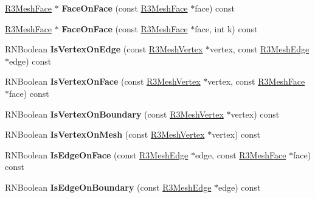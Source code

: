 \begin{DoxyCompactItemize}
\item 
\hyperlink{class_r3_mesh_face}{R3\+Mesh\+Face} $\ast$ {\bfseries Face\+On\+Face} (const \hyperlink{class_r3_mesh_face}{R3\+Mesh\+Face} $\ast$face) const \hypertarget{class_r3_mesh_ab95e83e97f5faf2c30619b98b9440da2}{}\label{class_r3_mesh_ab95e83e97f5faf2c30619b98b9440da2}

\item 
\hyperlink{class_r3_mesh_face}{R3\+Mesh\+Face} $\ast$ {\bfseries Face\+On\+Face} (const \hyperlink{class_r3_mesh_face}{R3\+Mesh\+Face} $\ast$face, int k) const \hypertarget{class_r3_mesh_aca889aae9c6e0a4fea8d530c7bfd36ae}{}\label{class_r3_mesh_aca889aae9c6e0a4fea8d530c7bfd36ae}

\item 
R\+N\+Boolean {\bfseries Is\+Vertex\+On\+Edge} (const \hyperlink{class_r3_mesh_vertex}{R3\+Mesh\+Vertex} $\ast$vertex, const \hyperlink{class_r3_mesh_edge}{R3\+Mesh\+Edge} $\ast$edge) const \hypertarget{class_r3_mesh_a265515e4a620c0176916f31546e643d8}{}\label{class_r3_mesh_a265515e4a620c0176916f31546e643d8}

\item 
R\+N\+Boolean {\bfseries Is\+Vertex\+On\+Face} (const \hyperlink{class_r3_mesh_vertex}{R3\+Mesh\+Vertex} $\ast$vertex, const \hyperlink{class_r3_mesh_face}{R3\+Mesh\+Face} $\ast$face) const \hypertarget{class_r3_mesh_ad72f53c674bdc231a0d5bf9e7f6226c5}{}\label{class_r3_mesh_ad72f53c674bdc231a0d5bf9e7f6226c5}

\item 
R\+N\+Boolean {\bfseries Is\+Vertex\+On\+Boundary} (const \hyperlink{class_r3_mesh_vertex}{R3\+Mesh\+Vertex} $\ast$vertex) const \hypertarget{class_r3_mesh_a03e5a0631c9f9d18da6ecefdc6b6a3b9}{}\label{class_r3_mesh_a03e5a0631c9f9d18da6ecefdc6b6a3b9}

\item 
R\+N\+Boolean {\bfseries Is\+Vertex\+On\+Mesh} (const \hyperlink{class_r3_mesh_vertex}{R3\+Mesh\+Vertex} $\ast$vertex) const \hypertarget{class_r3_mesh_a2af4c9ad23c129cab79e1f883b1325fb}{}\label{class_r3_mesh_a2af4c9ad23c129cab79e1f883b1325fb}

\item 
R\+N\+Boolean {\bfseries Is\+Edge\+On\+Face} (const \hyperlink{class_r3_mesh_edge}{R3\+Mesh\+Edge} $\ast$edge, const \hyperlink{class_r3_mesh_face}{R3\+Mesh\+Face} $\ast$face) const \hypertarget{class_r3_mesh_a794278ee32b2d21575c5d7f30d7c659d}{}\label{class_r3_mesh_a794278ee32b2d21575c5d7f30d7c659d}

\item 
R\+N\+Boolean {\bfseries Is\+Edge\+On\+Boundary} (const \hyperlink{class_r3_mesh_edge}{R3\+Mesh\+Edge} $\ast$edge) const \hypertarget{class_r3_mesh_a6390efb60f45202b333800bef21507b6}{}\label{class_r3_mesh_a6390efb60f45202b333800bef21507b6}


\end{DoxyCompactItemize}
